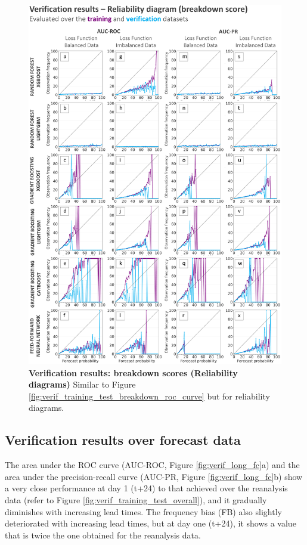 \begin{figure}[htbp]
\centering
\includegraphics[width=\textwidth]{verif_training_test_breakdown_reliability_diagram.png}
\caption{\textbf{Verification results: breakdown scores (Reliability diagrams)} Similar to Figure \ref{fig:verif_training_test_breakdown_roc_curve} but for reliability diagrams.}
\label{fig:verif_training_test_breakdown_reliability_diagram}
\end{figure}


\subsection{Verification results over forecast data}

The  area under the ROC curve (AUC-ROC, Figure \ref{fig:verif_long_fc}a) and the area under the precision-recall curve (AUC-PR, Figure \ref{fig:verif_long_fc}b) show a very close performance at day 1 (t+24) to that achieved over the reanalysis data (refer to Figure \ref{fig:verif_training_test_overall}), and it gradually diminishes with increasing lead times. The frequency bias (FB) also slightly deteriorated with increasing lead times, but at day one (t+24), it shows a value that is twice the one obtained for the reanalysis data. 

